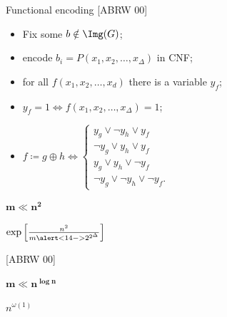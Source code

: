 \begin{frame}{Functional encoding [ABRW 00]}
    
    \pause
    \begin{minipage}{0.38\linewidth}
        \centering
        
    \end{minipage}
    \begin{minipage}{0.58\linewidth}
        \begin{itemize}
            \item Fix some $b \notin \Img(G)$;
                \pause
            \item encode $b_i = P(x_1, x_2, \dots, x_{\Delta})$ in CNF;
                \pause
            \item for all $f(x_1, x_2, \dots, x_d)$ there is a variable $y_f$;
            \item $y_f = 1 \Leftrightarrow f(x_1, x_2, \dots, x_{\Delta}) = 1$;
                \pause
            \item $f \coloneqq g \oplus h \Leftrightarrow
                \begin{cases}
                    y_g \lor \neg y_h \lor y_f \\
                    \neg y_g \lor y_h \lor y_f \\
                    y_g \lor y_h \lor \neg y_f \\
                    \neg y_g \lor \neg y_h \lor \neg y_f.
                \end{cases}$
        \end{itemize}
    \end{minipage}

    \pause
    \vspace{0.2cm}
    \begin{minipage}[t][3cm][t]{0.32\linewidth}
        \centering
        $\mathbf{m \ll n^2}$

        \pause
        \vspace{0.2cm}
        $\exp\left[\frac{n^2}{m \alert<14->{2^{2^{\Delta}}}} \right]$

        \vspace{0.2cm}
        [ABRW 00]
    \end{minipage}
    \pause
    \begin{minipage}[t][3cm][t]{0.32\linewidth}
        \centering
        $\mathbf{m \ll n^{\log n}}$

        \pause
        \vspace{0.2cm}
        $n^{\omega(1)}$


\end{minipage}
\end{frame}
